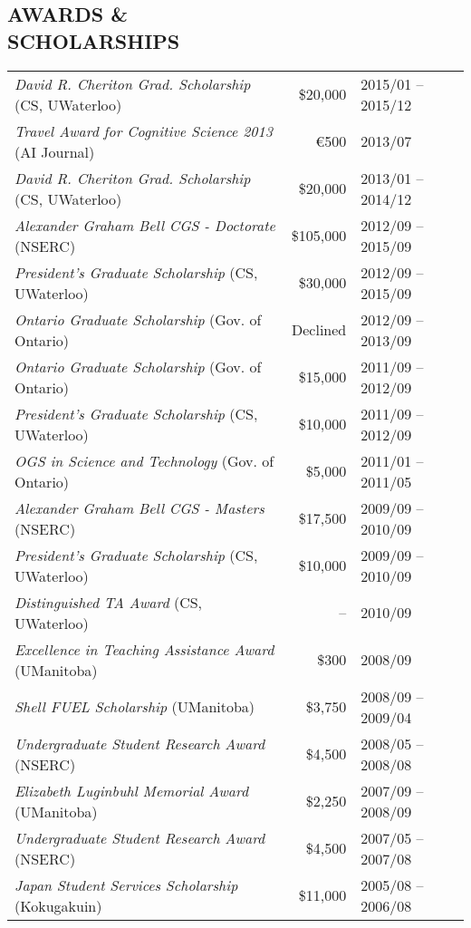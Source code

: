 \documentclass[line,margin]{res}
\begin{document}
\begin{resume}
\section{AWARDS \& \\ SCHOLARSHIPS}

\hspace{-1.4em}\begin{tabular}{lrl}
{\sl David R. Cheriton Grad. Scholarship} (CS, UWaterloo) &
\$20,000 & 2015/01 -- 2015/12\\
{\sl Travel Award for Cognitive Science 2013} (AI Journal) &
\euro{}500 & 2013/07 \\
{\sl David R. Cheriton Grad. Scholarship} (CS, UWaterloo) &
\$20,000 & 2013/01 -- 2014/12\\
{\sl Alexander Graham Bell CGS - Doctorate} (NSERC) &
\$105,000 & 2012/09 -- 2015/09 \\
{\sl President's Graduate Scholarship} (CS, UWaterloo) &
\$30,000 & 2012/09 -- 2015/09 \\
{\sl Ontario Graduate Scholarship} (Gov. of Ontario) &
Declined & 2012/09 -- 2013/09 \\
{\sl Ontario Graduate Scholarship} (Gov. of Ontario) &
\$15,000 & 2011/09 -- 2012/09 \\
{\sl President's Graduate Scholarship} (CS, UWaterloo) &
\$10,000 & 2011/09 -- 2012/09 \\
{\sl OGS in Science and Technology} (Gov. of Ontario) &
\$5,000 & 2011/01 -- 2011/05 \\
{\sl Alexander Graham Bell CGS - Masters} (NSERC) &
\$17,500 & 2009/09 -- 2010/09 \\
{\sl President's Graduate Scholarship} (CS, UWaterloo) &
\$10,000 & 2009/09 -- 2010/09 \\
{\sl Distinguished TA Award} (CS, UWaterloo) &
-- & 2010/09 \\
{\sl Excellence in Teaching Assistance Award} (UManitoba) &
\$300 & 2008/09 \\
{\sl Shell FUEL Scholarship} (UManitoba) &
\$3,750 & 2008/09 -- 2009/04 \\
{\sl Undergraduate Student Research Award} (NSERC) &
\$4,500 & 2008/05 -- 2008/08 \\
{\sl Elizabeth Luginbuhl Memorial Award} (UManitoba) &
\$2,250 & 2007/09 -- 2008/09 \\
{\sl Undergraduate Student Research Award} (NSERC) &
\$4,500 & 2007/05 -- 2007/08 \\
{\sl Japan Student Services Scholarship} (Kokugakuin) &
\$11,000 & 2005/08 -- 2006/08
\end{tabular}


\end{resume}
\end{document}
